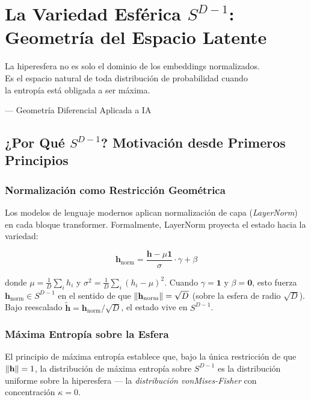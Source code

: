 \chapter{La Variedad Esférica $S^{D-1}$: Geometría del Espacio Latente}
\label{ch:variedad}

\epigraph{La hiperesfera no es solo el dominio de los embeddings normalizados.\\
Es el espacio natural de toda distribución de probabilidad cuando\\
la entropía está obligada a ser máxima.}{--- Geometría Diferencial Aplicada a IA}

\section{¿Por Qué $S^{D-1}$? Motivación desde Primeros Principios}

\subsection{Normalización como Restricción Geométrica}

Los modelos de lenguaje modernos aplican normalización de capa (\textit{LayerNorm})
en cada bloque transformer. Formalmente, LayerNorm proyecta el estado hacia
la variedad:

\begin{equation}
\mathbf{h}_{\text{norm}} = \frac{\mathbf{h} - \mu \mathbf{1}}{\sigma} \cdot \gamma + \beta
\end{equation}

donde $\mu = \frac{1}{D}\sum_i h_i$ y $\sigma^2 = \frac{1}{D}\sum_i(h_i - \mu)^2$.
Cuando $\gamma = \mathbf{1}$ y $\beta = \mathbf{0}$, esto fuerza $\mathbf{h}_{\text{norm}} \in S^{D-1}$
en el sentido de que $\norm{\mathbf{h}_{\text{norm}}} = \sqrt{D}$ (sobre la esfera de radio $\sqrt{D}$).
Bajo reescalado $\tilde{\mathbf{h}} = \mathbf{h}_{\text{norm}} / \sqrt{D}$, el estado vive en $S^{D-1}$.

\subsection{Máxima Entropía sobre la Esfera}

El principio de máxima entropía establece que, bajo la única restricción de
que $\norm{\mathbf{h}} = 1$, la distribución de máxima entropía sobre $S^{D-1}$
es la distribución uniforme sobre la hiperesfera --- la \textit{distribución vonMises-Fisher}
con concentración $\kappa = 0$.

